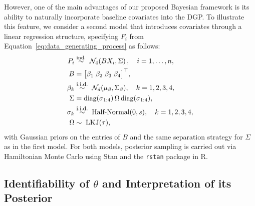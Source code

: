 \documentclass[referee,usenatbib]{biom}
\newcommand{\iid}{\overset{\text{\footnotesize i.i.d.}}{\sim}}
\begin{document}
However, one of the main advantages of our proposed Bayesian framework is its ability to naturally incorporate baseline covariates into the DGP. To illustrate this feature, we consider a second model that introduces covariates through a linear regression structure, specifying \(F_{i}\) from Equation~\eqref{eq:data_generating_process} as follows:
\begin{equation}
  \label{eq:parametric_model_covariates}
  \begin{aligned}
    P_{i} &\overset{\text{ind.}}{\sim}\;
            \mathcal{N}_{4}\!\left( B X_{i} , \Sigma \right), \quad i=1,\ldots,n, \\
    B &= \big[ \beta_{1} \; \beta_{2} \; \beta_{3} \; \beta_{4} \big]^{\top}, \\
    \beta_{k} & \iid \; \mathcal{N}_{d}(\mu_{\beta}, \Sigma_{\beta}), \quad k = 1,2,3,4, \\
    \Sigma &= \text{diag}(\sigma_{1:4}) \,\Omega\, \text{diag}(\sigma_{1:4}), \\
    \sigma_{k} &\iid \; \text{Half-Normal}(0, s), \quad k = 1,2,3,4, \\
    \Omega & \sim \; \text{LKJ}(\tau),
  \end{aligned}
\end{equation}
with Gaussian priors on the entries of \(B\) and the same separation strategy for \(\Sigma\) as in the first model. For both models, posterior sampling is carried out via Hamiltonian Monte Carlo \citep{neal2011mcmc} using Stan \citep{stan2023} and the \texttt{rstan} package \citep{rstan2023} in R.

\subsection{Identifiability of \texorpdfstring{\(\theta\)}{theta} and Interpretation of its Posterior}
\label{subsection:identifiability}
\end{document}
